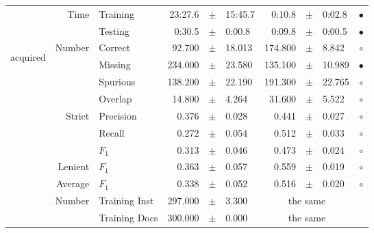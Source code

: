 \begin{longtable}{|r|r|l||rcl|rcl|c|}
\cline{2-10} & \multirow{2}{*}{      Time} &        Training &     23:27.6 &  $\pm$  &     15:45.7 &      0:10.8 &  $\pm$  &      0:02.8 & $\bullet$ \\
\cline{3-10} &                             &         Testing &      0:30.5 &  $\pm$  &      0:00.8 &      0:09.8 &  $\pm$  &      0:00.5 & $\bullet$ \\
\hline
\hline
\multirow{11}{*}{\begin{sideways}acquired\end{sideways} }
             & \multirow{4}{*}{    Number} &         Correct &      92.700 &  $\pm$  &      18.013 &     174.800 &  $\pm$  &       8.842 & $\circ$ \\
\cline{3-10} &                             &         Missing &     234.000 &  $\pm$  &      23.580 &     135.100 &  $\pm$  &      10.989 & $\bullet$ \\
\cline{3-10} &                             &        Spurious &     138.200 &  $\pm$  &      22.190 &     191.300 &  $\pm$  &      22.765 & $\circ$ \\
\cline{3-10} &                             &         Overlap &      14.800 &  $\pm$  &       4.264 &      31.600 &  $\pm$  &       5.522 & $\circ$ \\
\cline{2-10} & \multirow{3}{*}{    Strict} &       Precision &       0.376 &  $\pm$  &       0.028 &       0.441 &  $\pm$  &       0.027 & $\circ$ \\
\cline{3-10} &                             &          Recall &       0.272 &  $\pm$  &       0.054 &       0.512 &  $\pm$  &       0.033 & $\circ$ \\
\cline{3-10} &                             &           $F_1$ &       0.313 &  $\pm$  &       0.046 &       0.473 &  $\pm$  &       0.024 & $\circ$ \\
\cline{2-10} &                     Lenient &           $F_1$ &       0.363 &  $\pm$  &       0.057 &       0.559 &  $\pm$  &       0.019 & $\circ$ \\
\cline{2-10} &                     Average &           $F_1$ &       0.338 &  $\pm$  &       0.052 &       0.516 &  $\pm$  &       0.020 & $\circ$ \\
\cline{2-10} & \multirow{2}{*}{    Number} &   Training Inst &     297.000 &  $\pm$  &       3.300 &    \multicolumn{3}{c|}{the same}         &  \\
\cline{3-10} &                             &   Training Docs &     300.000 &  $\pm$  &       0.000 &    \multicolumn{3}{c|}{the same}         &  \\

\end{longtable}
